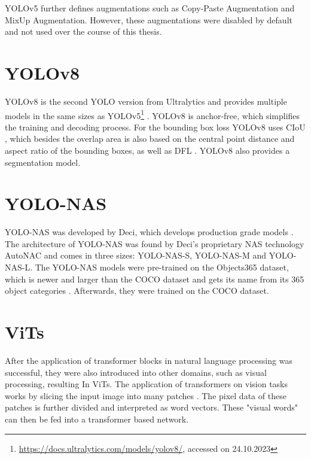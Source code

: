 \documentclass[10pt]{book}
\begin{document}
\ac{YOLO}v5 further defines augmentations such as Copy-Paste Augmentation and MixUp Augmentation. However, these augmentations were disabled by default and not used over the course of this thesis.

\section{YOLOv8}

\ac{YOLO}v8 is the second \ac{YOLO} version from Ultralytics and provides multiple models in the same sizes as \ac{YOLO}v5\footnote{\url{https://docs.ultralytics.com/models/yolov8/}, accessed on 24.10.2023} \cite{terven2023comprehensive}. \ac{YOLO}v8 is anchor-free, which simplifies the training and decoding process. For the bounding box loss \ac{YOLO}v8 uses \ac{CIoU} \cite{zheng2020distance}, which besides the overlap area is also based on the central point distance and aspect ratio of the bounding boxes, as well as \ac{DFL} \cite{li2020generalized}. \ac{YOLO}v8 also provides a segmentation model.

\section{YOLO-NAS}

\ac{YOLO}-NAS was developed by Deci, which develops production grade models \cite{terven2023comprehensive}. The architecture of \ac{YOLO}-NAS was found by Deci's proprietary \ac{NAS} technology AutoNAC and comes in three sizes: \ac{YOLO}-NAS-S, \ac{YOLO}-NAS-M and \ac{YOLO}-NAS-L. The \ac{YOLO}-NAS models were pre-trained on the Objects365 dataset, which is newer and larger than the \ac{COCO} dataset and gets its name from its 365 object categories \cite{shao2019objects365}. Afterwards, they were trained on the \ac{COCO} dataset.


\section{ViTs}

After the application of transformer blocks in natural language processing was successful, they were also introduced into other domains, such as visual processing, resulting In \acp{ViT}. The application of transformers on vision tasks works by slicing the input image into many patches \cite{dosovitskiy2020image}. The pixel data of these patches is further divided and interpreted as word vectors. These "visual words" can then be fed into a transformer based network.
\end{document}

